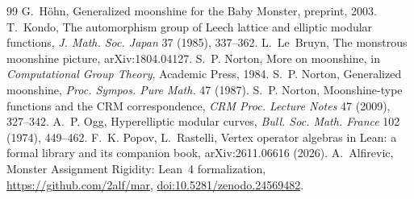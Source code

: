 \documentclass[11pt]{amsart}
\theoremstyle{definition}
\begin{document}
\begin{thebibliography}{99}
 G.~H\"ohn, Generalized moonshine for the Baby Monster, preprint, 2003.
 T.~Kondo, The automorphism group of Leech lattice and elliptic modular functions, \emph{J. Math. Soc. Japan} 37 (1985), 337--362.
 L.~Le~Bruyn, The monstrous moonshine picture, arXiv:1804.04127.
 S.~P. Norton, More on moonshine, in \emph{Computational Group Theory}, Academic Press, 1984.
 S.~P. Norton, Generalized moonshine, \emph{Proc. Sympos. Pure Math.} 47 (1987).
 S.~P. Norton, Moonshine-type functions and the CRM correspondence, \emph{CRM Proc. Lecture Notes} 47 (2009), 327--342.
 A.~P. Ogg, Hyperelliptic modular curves, \emph{Bull. Soc. Math. France} 102 (1974), 449--462.
 F.~K. Popov, L.~Rastelli, Vertex operator algebras in Lean: a formal library and its companion book, arXiv:2611.06616 (2026).
 A.~Alfirevic, Monster Assignment Rigidity: Lean~4 formalization, \url{https://github.com/2alf/mar}, \href{https://doi.org/10.5281/zenodo.24569482}{doi:10.5281/zenodo.24569482}.
\end{thebibliography}
\end{document}
